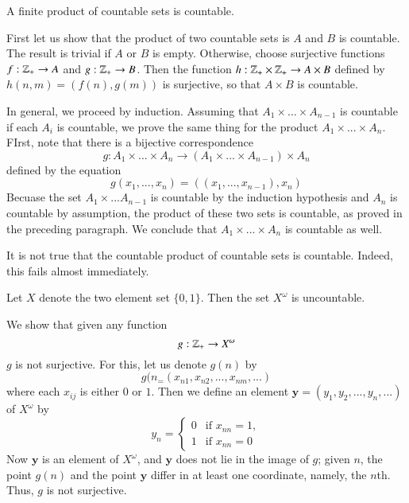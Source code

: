 \documentclass[12pt, a4paper, twoside, openright, titlepage]{book}
\begin{document}
\begin{appendices}
    \begin{thm}{}{}
        A finite product of countable sets is countable.
    \end{thm}
    \begin{proof*}{}{}
        First let us show that the product of two countable sets is $A$ and $B$ is countable. The result is trivial if $A$ or $B$ is empty. Otherwise, choose surjective functions $f:\mathbb Z_+\rightarrow A$ and $g:\mathbb Z_+\rightarrow B$. Then the function $h:\mathbb Z_+\times \mathbb Z_+\rightarrow A\times B$ defined by $h(n,m) = (f(n),g(m))$ is surjective, so that $A\times B$ is countable.


        In general, we proceed by induction. Assuming that $A_1\times ... \times A_{n-1}$ is countable if each $A_i$ is countable, we prove the same thing for the product $A_1\times ... \times A_n$. FIrst, note that there is a bijective correspondence \begin{equation*}
            g:A_1\times ... \times A_n\rightarrow (A_1\times ... \times A_{n-1})\times A_n
        \end{equation*}
        defined by the equation \begin{equation*}
            g(x_1,...,x_n) = ((x_1,...,x_{n-1}),x_n)
        \end{equation*}
        Becuase the set $A_1\times ... A_{n-1}$ is countable by the induction hypothesis and $A_n$ is countable by assumption, the product of these two sets is countable, as proved in the preceding paragraph. We conclude that $A_1\times ... \times A_n$ is countable as well.
    \end{proof*}

    It is not true that the countable product of countable sets is countable. Indeed, this fails almost immediately.

    \begin{thm}{}{}
        Let $X$ denote the two element set $\{0,1\}$. Then the set $X^{\omega}$ is uncountable.
    \end{thm}
    \begin{proof*}{}{}
        We show that given any function $$g:\mathbb Z_+\rightarrow X^{\omega}$$ $g$ is not surjective. For this, let us denote $g(n)$ by \begin{equation*}
            g(n_ = (x_{n1},x_{n2},...,x_{nm},...)
        \end{equation*}
        where each $x_{ij}$ is either $0$ or $1$. Then we define an element $\mathbf{y} = (y_1,y_2,...,y_n,...)$ of $X^{\omega}$ by \begin{equation*}
            y_n = \left\{\begin{array}{ll} 0 & \text{if } x_{nn} = 1,\\ 1 & \text{if } x_{nn} = 0\end{array}\right.
        \end{equation*}
        Now $\mathbf{y}$ is an element of $X^{\omega}$, and $\mathbf{y}$ does not lie in the image of $g$; given $n$, the point $g(n)$ and the point $\mathbf{y}$ differ in at least one coordinate, namely, the $n$th. Thus, $g$ is not surjective.
    \end{proof*}



\end{appendices}
\end{document}
